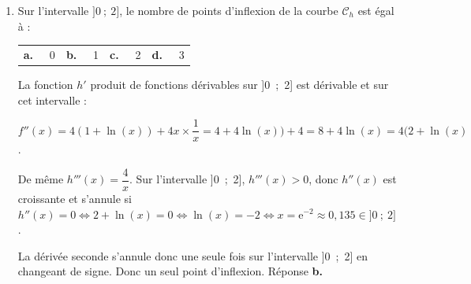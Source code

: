 \begin{enumerate}[resume]
$\bullet~~$$h'\left(\sqrt{\text{e}}\right)  = 4 \times \sqrt{\text{e}}\left(1 + \ln \left(\sqrt{\text{e}}\right)\right) = 4 \times \sqrt{\text{e}} \times \left(1 + \dfrac12\right) = 6\sqrt{\text{e}}$.

$\bullet~~$$h\left(\sqrt{\text{e}}\right) = \left(\sqrt{\text{e}}\right)^2\left(1 + 2 \ln \left(\sqrt{\text{e}}\right)\right) = \text{e}\ln \left(1 +  2 \times \dfrac12\ln \text{e}\right) = \text{e}\times (1 + 1) = 2\text{e}$.

L'équation de la tangente s'écrit donc :

$y - 2\text{e} = 6\sqrt{\text{e}}\left(x - \sqrt{\text{e}}\right) \iff y = 2\text{e} + 6x\sqrt{\text{e}} - 6\text{e}\iff y = 6x\sqrt{\text{e}} - 4\text{e}$. Réponse \textbf{d.}

\item Sur l'intervalle $]0~;~2]$, le nombre de points d'inflexion de la courbe $\mathcal{C}_h$ est égal à :

\begin{center}
\begin{tabularx}{\linewidth}{*{4}{X}}
\textbf{a.~~} 0&\textbf{b.~~} 1 &\textbf{c.~~} 2 &\textbf{d.~~} 3
\end{tabularx}
\end{center}

La fonction $h'$ produit de fonctions dérivables sur ]0~;~2] est dérivable et sur cet intervalle :

$f''(x) = 4(1 + \ln (x)) + 4x \times \dfrac{1}{x} = 4 + 4\ln (x)) + 4 = 8 + 4\ln (x) = 4(2 + \ln (x)$.

De même $h'''(x) = \dfrac{4}{x}$. Sur l'intervalle ]0~;~2], $h'''(x) > 0$, donc $h''(x)$ est croissante et s'annule si $h''(x) = 0 \iff 2 + \ln (x) = 0 \iff \ln (x) = - 2 \iff x = \text{e}^{-2} \approx 0,135 \in ]0~;~2]$.

La dérivée seconde s'annule donc une seule fois sur l'intervalle ]0~;~2] en changeant de signe. Donc un seul point d'inflexion. Réponse \textbf{b.}
\end{enumerate}

\bigskip
